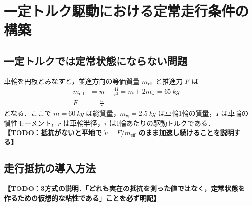 \documentclass[uplatex,dvipdfmx]{jsarticle}
\newcommand{\todo}[1]{\textbf{【TODO：#1】}}
\begin{document}
\section{一定トルク駆動における定常走行条件の構築}

\subsection{一定トルクでは定常状態にならない問題}
車輪を円板とみなすと，並進方向の等価質量 $m_{\mathrm{eff}}$ と推進力 $F$ は
\begin{align}
  m_{\mathrm{eff}} &= m + \frac{4I}{r^{2}} = m + 2m_{\mathrm{w}} = \SI{65}{kg}
  \label{eq:meff}\\
  F &= \frac{4\tau}{r}
  \label{eq:force}
\end{align}
となる．ここで $m = \SI{60}{kg}$ は総質量，$m_{\mathrm{w}} = \SI{2.5}{kg}$ は車輪1輪の質量，$I$ は車輪の慣性モーメント，$r$ は車輪半径，$\tau$ は1輪あたりの駆動トルクである．
\todo{抵抗がないと平地で $\dot v = F/m_{\mathrm{eff}}$ のまま加速し続けることを説明する}

\subsection{走行抵抗の導入方法}
\todo{3方式の説明．「どれも実在の抵抗を測った値ではなく，定常状態を作るための仮想的な粘性である」ことを必ず明記}

\begin{table}[t!]
    \caption{Three methods of introducing running resistance}
    \label{tab:drag_methods}
    \centering
\end{table}

%
\end{document}

